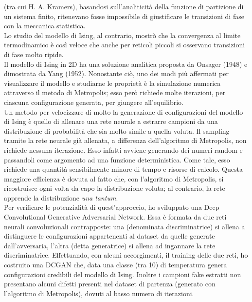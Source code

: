 \documentclass[Lau, noexaminfo, oneside]{sapthesis} %
\begin{document}
(tra cui H. A. Kramers), basandosi sull'analiticità della funzione di partizione di un sistema finito, ritenevano fosse impossibile di giustificare le transizioni di fase con la meccanica statistica. \cite{Kadanoff2009} \\
Lo studio del modello di Ising, al contrario, mostrò che la convergenza al limite termodinamico è così veloce che anche per reticoli piccoli si osservano transizioni di fase molto ripide.\\
Il modello di Ising in 2D ha una soluzione analitica proposta da Onsager (1948) e dimostrata da Yang (1952). Nonostante ciò, uno dei modi più affermati per visualizzare il modello e studiarne le proprietà è la simulazione numerica attraverso il metodo di Metropolis; esso però richiede molte iterazioni, per ciascuna configurazione generata, per giungere all'equilibrio. \\
Un metodo per velocizzare di molto la generazione di configurazioni del modello di Ising è quello di allenare una rete neurale a estrarre campioni da una distribuzione di probabilità che sia molto simile a quella voluta. Il sampling tramite la rete neurale già allenata, a differenza dell'algoritmo di Metropolis, non richiede nessuna iterazione. Esso infatti avviene generando dei numeri random e passandoli come argomento ad una funzione deterministica. Come tale, esso richiede una quantità sensibilmente minore di tempo e risorse di calcolo. Questa maggiore efficienza è dovuta al fatto che, con l'algoritmo di Metropolis, si ricostruisce ogni volta da capo la distribuzione voluta; al contrario, la rete apprende la distribuzione \textit{una tantum}. \\
Per verificare le potenzialità di quest'approccio, ho sviluppato una Deep Convolutional Generative Adversarial Network. Essa è formata da due reti neurali convoluzionali contrapposte: una (denominata discriminatrice) si allena a distinguere le configurazioni appartenenti al dataset da quelle generate dall'avversaria, l'altra (detta generatrice) si allena ad ingannare la rete discriminatrice. Effettuando, con alcuni accorgimenti, il training delle due reti, ho costruito una DCGAN che, data una classe (tra 10) di temperatura genera configurazioni credibili del modello di Ising. Inoltre i campioni fake estratti non presentano alcuni difetti presenti nel dataset di partenza (generato con l'algoritmo di Metropolis), dovuti al basso numero di iterazioni.
\end{document}
